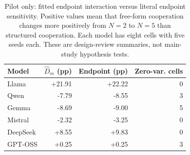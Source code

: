\begin{table}[t]
\centering
\small
\setlength{\tabcolsep}{4pt}
\begin{tabular}{lrrr}
\toprule
Model & $\widehat D_m$ (pp) & Endpoint (pp) & Zero-var. cells \\
\midrule
Llama & +21.91 & +22.22 & 0 \\
Qwen & -7.79 & -8.55 & 3 \\
Gemma & -8.69 & -9.00 & 5 \\
Mistral & -2.32 & -3.25 & 0 \\
DeepSeek & +8.55 & +9.83 & 0 \\
GPT-OSS & +0.25 & +0.25 & 3 \\
\bottomrule
\end{tabular}
\caption{Pilot only: fitted endpoint interaction versus literal endpoint sensitivity. Positive values mean that free-form cooperation changes more positively from $N=2$ to $N=5$ than structured cooperation. Each model has eight cells with five seeds each. These are design-review summaries, not main-study hypothesis tests.}
\label{tab:pilot}
\end{table}
